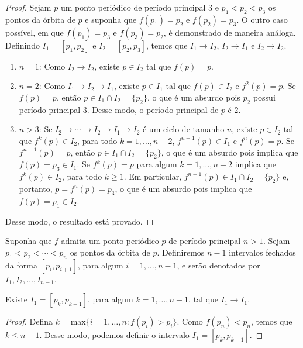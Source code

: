 \begin{definition}
\begin{proof}
Sejam $p$ um ponto periódico de período principal $3$ e $p_1 < p_2 < p_3$ os pontos da órbita de $p$ e suponha que $f(p_1) = p_2$ e $f(p_2) = p _3$. O outro caso possível, em que $f(p_1) = p_3$ e $f(p_3) = p_2$, é demonstrado de maneira análoga. Definindo $I_1 = [p_1, p_2]$ e $I_2 = [p_2, p_3]$, temos que $I_1 \longrightarrow I_2$, $I_2 \longrightarrow I_1$ e $I_2 \longrightarrow I_2$.
\begin{enumerate}
\item $n = 1$: Como $I_2 \longrightarrow I_2$, existe $p \in I_2$ tal que $f(p) = p$.
\item $n = 2$: Como $I_1 \longrightarrow I_2 \longrightarrow I_1$, existe $p \in I_1$ tal que $f(p) \in I_2$ e $f^2(p) = p$. Se $f(p) = p$, então $p \in I_1 \cap I_2 = \{p_2\}$, o que é um absurdo pois $p_2$ possui período principal 3. Desse modo, o período principal de $p$ é $2$.
\item $n > 3$: Se $I_2 \longrightarrow \cdots \longrightarrow I_2 \longrightarrow I_1 \longrightarrow I_2$ é um ciclo de tamanho $n$, existe $p \in I_2$ tal que $f^k(p) \in I_2$, para todo $k = 1, \dots, n-2$, $f^{n-1}(p) \in I_1$ e $f^n(p) = p$. Se $f^{n-1}(p) = p$, então $p \in I_1 \cap I_2 = \{p_2\}$, o que é um absurdo pois implica que $f(p) = p_3 \in I_1$. Se $f^k(p) = p$ para algum $k = 1, \dots, n-2$ implica que $f^k(p) \in I_2$, para todo $k \geq 1$. Em particular, $f^{n-1}(p) \in I_1 \cap I_2 = \{p_2\}$ e, portanto, $p = f^n(p) = p_3$, o que é um absurdo pois implica que $f(p) = p_1 \in I_2$. 
\end{enumerate}
Desse modo, o resultado está provado.
\end{proof}

Suponha que $f$ admita um ponto periódico $p$ de período principal $n > 1$. Sejam $p_1 < p_2 < \cdots < p_n$ os pontos da órbita de $p$. Definiremos $n-1$ intervalos fechados da forma $[p_i, p_{i+1}]$, para algum $i = 1, \dots, n-1$, e serão denotados por $I_1, I_2, \dots, I_{n-1}$.

\begin{lemma}
Existe $I_1 = [p_k, p_{k+1}]$, para algum $k = 1, \dots, n-1$, tal que $I_1 \longrightarrow I_1$.
\end{lemma}

\begin{proof}
Defina $k = \textrm{max}\{i = 1, \dots, n : f(p_i) > p_i\}$. Como $f(p_{n}) < p_n$, temos que $k \leq n-1$. Desse modo, podemos definir o intervalo $I_1 = [p_k, p_{k+1}]$.


\end{proof}
\end{definition}
